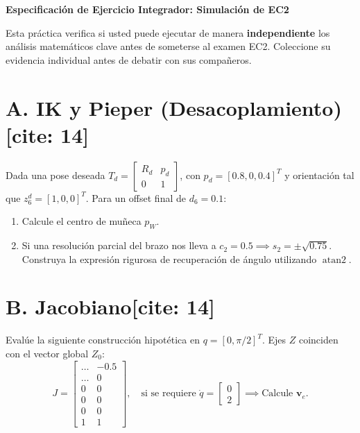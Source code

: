 \documentclass[11pt, a4paper]{article}
\begin{document}
\begin{center}
    \Large\textbf{\textcolor{ucbblue}{Especificación de Ejercicio Integrador: Simulación de EC2}}\\[0.2cm]
\end{center}

\begin{tcolorbox}[colback=white, colframe=black, title=\textbf{Objetivo Evaluativo[cite: 14]}]
    \small Esta práctica verifica si usted puede ejecutar de manera \textbf{independiente} los análisis matemáticos clave antes de someterse al examen EC2. Coleccione su evidencia individual antes de debatir con sus compañeros.
\end{tcolorbox}

\section*{A. IK y Pieper (Desacoplamiento)[cite: 14]}
Dada una pose deseada $T_d = \begin{bmatrix} R_d & p_d \\ 0 & 1 \end{bmatrix}$, con $p_d = [0.8, 0, 0.4]^T$ y orientación tal que $z_6^d = [1, 0, 0]^T$. Para un offset final de $d_6 = 0.1$:
\begin{enumerate}
    \item Calcule el centro de muñeca $p_W$.
    \item Si una resolución parcial del brazo nos lleva a $c_2 = 0.5 \implies s_2 = \pm\sqrt{0.75}$. Construya la expresión rigurosa de recuperación de ángulo utilizando $\operatorname{atan2}$.
\end{enumerate}

\section*{B. Jacobiano[cite: 14]}
Evalúe la siguiente construcción hipotética en $q = [0, \pi/2]^T$. Ejes $Z$ coinciden con el vector global $Z_0$:
\begin{equation*}
    J = \begin{bmatrix} \dots & -0.5 \\ \dots & 0 \\ 0 & 0 \\ 0 & 0 \\ 0 & 0 \\ 1 & 1 \end{bmatrix}, \quad \text{si se requiere } \dot{q} = \begin{bmatrix} 0 \\ 2 \end{bmatrix} \implies \text{Calcule } \mathbf{v}_e.
\end{equation*}
\end{document}
